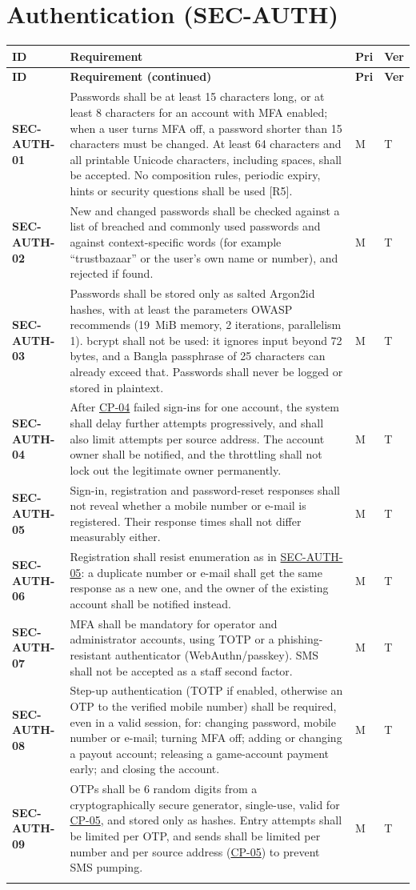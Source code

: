 \documentclass[11pt,a4paper]{report}
\makeatletter
\newenvironment{reqs}{%
  \small
  \begin{longtable}{@{}>{\raggedright\arraybackslash}p{2.35cm}
                       >{\raggedright\arraybackslash}p{10.3cm}
                       >{\centering\arraybackslash}p{0.7cm}
                       >{\centering\arraybackslash}p{0.7cm}@{}}
  \toprule
  \textbf{ID} & \textbf{Requirement} & \textbf{Pri} & \textbf{Ver} \\
  \midrule
  \endfirsthead
  \toprule
  \textbf{ID} & \textbf{Requirement (continued)} & \textbf{Pri} & \textbf{Ver} \\
  \midrule
  \endhead
  \bottomrule
  \endfoot
}{\end{longtable}}
\newcommand{\req}[5]{\leavevmode\textbf{#1}\hypertarget{#1}{} & #5 & #2 & #3 \\ \addlinespace[2pt]}
\newcommand{\rr}[1]{\hyperlink{#1}{#1}}
\newcommand{\cp}[1]{\hyperlink{#1}{#1}}
\makeatother
\begin{document}
\section{Authentication (SEC-AUTH)}
\begin{reqs}
\req{SEC-AUTH-01}{M}{T}{FR-2}{Passwords shall be at least 15 characters long, or at least 8 characters for an account with MFA enabled; when a user turns MFA off, a password shorter than 15 characters must be changed. At least 64 characters and all printable Unicode characters, including spaces, shall be accepted. No composition rules, periodic expiry, hints or security questions shall be used [R5].}
\req{SEC-AUTH-02}{M}{T}{new}{New and changed passwords shall be checked against a list of breached and commonly used passwords and against context-specific words (for example ``trustbazaar'' or the user's own name or number), and rejected if found.}
\req{SEC-AUTH-03}{M}{T}{FR-2}{Passwords shall be stored only as salted Argon2id hashes, with at least the parameters OWASP recommends (19~MiB memory, 2 iterations, parallelism 1). bcrypt shall not be used: it ignores input beyond 72 bytes, and a Bangla passphrase of 25 characters can already exceed that. Passwords shall never be logged or stored in plaintext.}
\req{SEC-AUTH-04}{M}{T}{NFR-7}{After \cp{CP-04} failed sign-ins for one account, the system shall delay further attempts progressively, and shall also limit attempts per source address. The account owner shall be notified, and the throttling shall not lock out the legitimate owner permanently.}
\req{SEC-AUTH-05}{M}{T}{new}{Sign-in, registration and password-reset responses shall not reveal whether a mobile number or e-mail is registered. Their response times shall not differ measurably either.}
\req{SEC-AUTH-06}{M}{T}{new}{Registration shall resist enumeration as in \rr{SEC-AUTH-05}: a duplicate number or e-mail shall get the same response as a new one, and the owner of the existing account shall be notified instead.}
\req{SEC-AUTH-07}{M}{T}{new}{MFA shall be mandatory for operator and administrator accounts, using TOTP or a phishing-resistant authenticator (WebAuthn/passkey). SMS shall not be accepted as a staff second factor.}
\req{SEC-AUTH-08}{M}{T}{new}{Step-up authentication (TOTP if enabled, otherwise an OTP to the verified mobile number) shall be required, even in a valid session, for: changing password, mobile number or e-mail; turning MFA off; adding or changing a payout account; releasing a game-account payment early; and closing the account.}
\req{SEC-AUTH-09}{M}{T}{new}{OTPs shall be 6 random digits from a cryptographically secure generator, single-use, valid for \cp{CP-05}, and stored only as hashes. Entry attempts shall be limited per OTP, and sends shall be limited per number and per source address (\cp{CP-05}) to prevent SMS pumping.}

\end{reqs}
\end{document}
